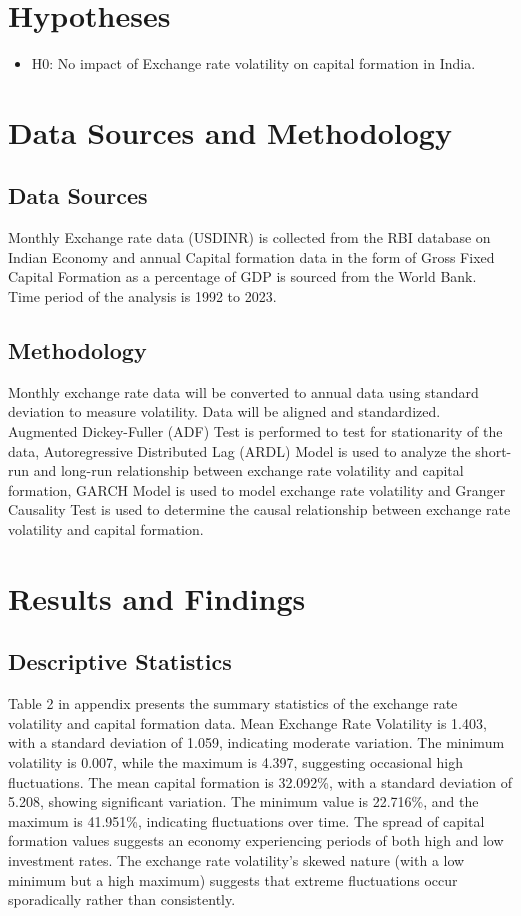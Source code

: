 \documentclass{article} %
\begin{document}
\section{Hypotheses}
\begin{itemize}
    \item H0: No impact of Exchange rate volatility on capital formation in India.
\end{itemize}

\section{Data Sources and Methodology}
\subsection{Data Sources}
Monthly Exchange rate data (USDINR) is collected from the RBI database on Indian
Economy and annual Capital formation data in the form of Gross Fixed Capital Formation
as a percentage of GDP is sourced from the World Bank. Time period of the analysis is 1992
to 2023.

\subsection{Methodology}
Monthly exchange rate data will be converted to annual data using standard deviation to
measure volatility. Data will be aligned and standardized. Augmented Dickey-Fuller
(ADF) Test is performed to test for stationarity of the data, Autoregressive Distributed
Lag (ARDL) Model is used to analyze the short-run and long-run relationship between
exchange rate volatility and capital formation, GARCH Model is used to model exchange
rate volatility and Granger Causality Test is used to determine the causal relationship
between exchange rate volatility and capital formation.

\section{Results and Findings}

\subsection{Descriptive Statistics}
Table 2 in appendix presents the summary statistics of
the exchange rate volatility and capital
formation data. Mean Exchange Rate Volatility is 1.403, with a standard deviation of 1.059, indicating moderate variation. The minimum volatility is 0.007, while the maximum is 4.397, suggesting occasional high fluctuations. The mean capital formation is 32.092\%, with a standard deviation of 5.208, showing significant variation. The minimum value is 22.716\%, and the maximum is 41.951\%, indicating fluctuations over time.
The spread of capital formation values suggests an economy experiencing periods of both high and low investment rates. The exchange rate volatility's skewed nature (with a low minimum but a high maximum) suggests that extreme fluctuations occur sporadically rather than consistently.
\end{document}
